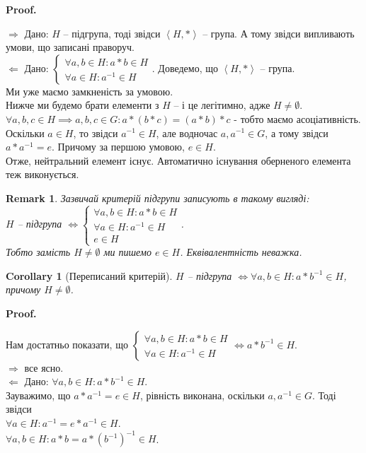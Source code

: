 \documentclass[a4paper, 10pt]{article}
\makeatletter
\def\rightproof{$\boxed{\Rightarrow}$ }
\def\leftproof{$\boxed{\Leftarrow}$ }
\theoremstyle{theoremdd}
\theoremstyle{theoremdd}
\theoremstyle{theoremdd}
\theoremstyle{theoremdd}
\theoremstyle{theoremdd}
\theoremstyle{theoremdd}
\theoremstyle{theoremdd}
\theoremstyle{theoremdd}
\theoremstyle{theoremdd}
\theoremstyle{theoremdd}
\theoremstyle{theoremdd}
\newtheorem{remark}[theorem]{Remark}
\theoremstyle{theoremdd}
\theoremstyle{theoremdd}
\theoremstyle{theoremdd}
\newtheorem{corollary}[theorem]{Corollary}
\theoremstyle{theoremdd}
\renewenvironment{proof}[1][Proof.\\]{\par
\pushQED{\hfill \qed}%
\normalfont \topsep6\p@\@plus6\p@\relax
\trivlist
\item\relax
{\bfseries
#1\@addpunct{.}}\hspace\labelsep\ignorespaces
}{%
\popQED\endtrivlist\@endpefalse
}
\makeatother
\begin{document}
\begin{proof}
\rightproof Дано: $H$ -- підгрупа, тоді звідси $\left<H,* \right>$ -- група. А тому звідси випливають умови, що записані праворуч.
\bigskip \\
\leftproof Дано: $\begin{cases} \forall a,b \in H: a*b \in H \\ \forall a \in H: a^{-1} \in H \end{cases}$. Доведемо, що $\left<H,* \right>$ -- група.\\
Ми уже маємо замкненість за умовою.\\
Нижче ми будемо брати елементи з $H$ -- і це легітимно, адже $H \neq \emptyset$.\\
$\forall a,b,c \in H \implies a,b,c \in G: a*(b*c) = (a*b)*c$ - тобто маємо асоціативність.\\
Оскільки $a \in H$, то звідси $a^{-1} \in H$, але водночас $a,a^{-1} \in G$, а тому звідси $a*a^{-1} = e$. Причому за першою умовою, $e \in H$.\\
Отже, нейтральний елемент існує. Автоматично існування оберненого елемента теж виконується.
\end{proof}

\begin{remark}
Зазвичай критерій підгрупи записують в такому вигляді:\\
$H$ -- підгрупа $\iff \begin{cases} \forall a,b \in H: a*b \in H \\ \forall a \in H: a^{-1} \in H \\ e \in H \end{cases}$.\\
Тобто замість $H \neq \emptyset$ ми пишемо $e \in H$. Еквівалентність неважка.
\end{remark}

\begin{corollary}[Переписаний критерій]
$H$ -- підгрупа $\iff \forall a,b \in H: a*b^{-1} \in H$, причому $H \neq \emptyset$.
\end{corollary}

\begin{proof}
Нам достатньо показати, що $\begin{cases} \forall a,b \in H: a*b \in H \\ \forall a \in H: a^{-1} \in H \end{cases} \iff a*b^{-1} \in H$.\\
\rightproof все ясно.\\
\leftproof Дано: $\forall a,b \in H: a*b^{-1} \in H$.\\
Зауважимо, що $a*a^{-1} = e \in H$, рівність виконана, оскільки $a,a^{-1} \in G$. Тоді звідси\\
$\forall a \in H: a^{-1} = e*a^{-1} \in H$.\\
$\forall a,b \in H: a*b = a*(b^{-1})^{-1} \in H$.
\end{proof}
\end{document}
